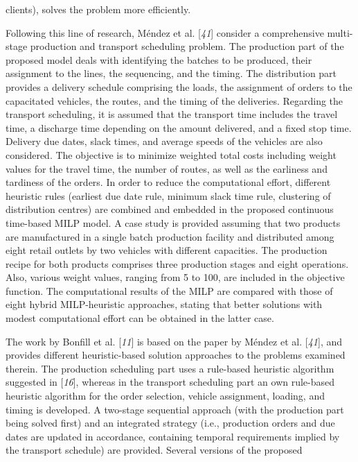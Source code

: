  clients), solves the problem more efficiently.\par Following this line of research, Méndez et al. [\textit{41}] consider a comprehensive multi-stage production and transport
 scheduling problem. The production part of the proposed model deals with identifying
 the batches to be produced, their assignment to the lines, the sequencing, and the
 timing. The distribution part provides a delivery schedule comprising the loads, the
 assignment of orders to the capacitated vehicles, the routes, and the timing of the
 deliveries. Regarding the transport scheduling, it is assumed that the transport time
 includes the travel time, a discharge time depending on the amount delivered, and a
 fixed stop time. Delivery due dates, slack times, and average speeds of the vehicles
 are also considered. The objective is to minimize weighted total costs including
 weight values for the travel time, the number of routes, as well as the earliness and
 tardiness of the orders. In order to reduce the computational effort, different
 heuristic rules (earliest due date rule, minimum slack time rule, clustering of
 distribution centres) are combined and embedded in the proposed continuous time-based
 MILP model. A case study is provided assuming that two products are manufactured in a
 single batch production facility and distributed among eight retail outlets by two
 vehicles with different capacities. The production recipe for both products comprises
 three production stages and eight operations. Also, various weight values, ranging
 from 5 to 100, are included in the objective function. The computational results of
 the MILP are compared with those of eight hybrid MILP-heuristic approaches, stating
 that better solutions with modest computational effort can be obtained in the latter
 case.\par The work by Bonfill et al. [\textit{11}] is based on
 the paper by Méndez et al. [\textit{41}], and provides
 different heuristic-based solution approaches to the problems examined therein. The
 production scheduling part uses a rule-based heuristic algorithm suggested in [\textit{16}], whereas in the transport scheduling part an
 own rule-based heuristic algorithm for the order selection, vehicle assignment,
 loading, and timing is developed. A two-stage sequential approach (with the
 production part being solved first) and an integrated strategy (i.e., production
 orders and due dates are updated in accordance, containing temporal requirements
 implied by the transport schedule) are provided. Several versions of the proposed
